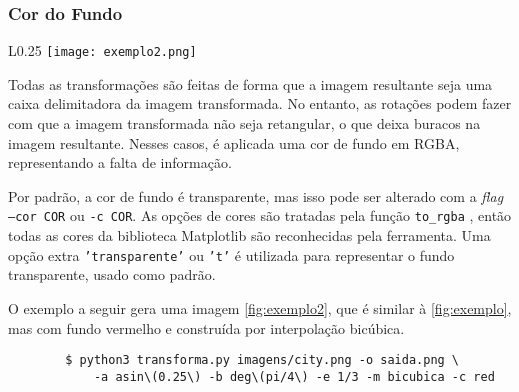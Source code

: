 \subsubsection{Cor do Fundo}

    \begin{wrapfigure}{L}{0.25\textwidth}
        \centering
        \texttt{[image: exemplo2.png]}
        \caption{Exemplo de execução.}
        \label{fig:exemplo2}
    \end{wrapfigure}

    Todas as transformações são feitas de forma que a imagem resultante seja uma caixa delimitadora da imagem transformada. No entanto, as rotações podem fazer com que a imagem transformada não seja retangular, o que deixa buracos na imagem resultante. Nesses casos, é aplicada uma cor de fundo em RGBA, representando a falta de informação.

    Por padrão, a cor de fundo é transparente, mas isso pode ser alterado com a \textit{flag} \texttt{--cor COR} ou \texttt{-c COR}. As opções de cores são tratadas pela função \texttt{to_rgba} \autocite{torbga}, então todas as cores da biblioteca Matplotlib são reconhecidas pela ferramenta. Uma opção extra \texttt{'transparente'} ou \texttt{'t'} é utilizada para representar o fundo transparente, usado como padrão.

    O exemplo a seguir gera uma imagem \cref{fig:exemplo2}, que é similar à \ref{fig:exemplo}, mas com fundo vermelho e construída por interpolação bicúbica.

    \begin{verbatim}
        $ python3 transforma.py imagens/city.png -o saida.png \
            -a asin\(0.25\) -b deg\(pi/4\) -e 1/3 -m bicubica -c red
    \end{verbatim}
